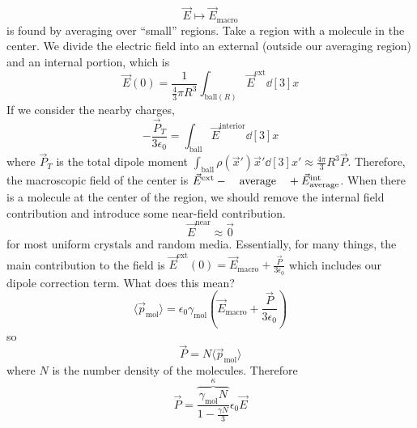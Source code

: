 \documentclass[a4paper,twoside,master.tex]{subfiles}
\begin{document}
\begin{equation}
    \vec{E} \mapsto \vec{E}_{\text{macro}}
\end{equation}
is found by averaging over ``small'' regions. Take a region with a molecule in the center. We divide the electric field into an external (outside our averaging region) and an internal portion, which is
\begin{equation}
    \vec{E}(0) = \frac{1}{\frac{4}{3} \pi R^3} \int_{\text{ball}(R)} \vec{E}^{\text{ext}} \dd[3]{x}
\end{equation}
If we consider the nearby charges,
\begin{equation}
    - \frac{ \vec{P}_T}{3 \epsilon_0} = \int_{\text{ball}} \vec{E}^{\text{interior}} \dd[3]{x}
\end{equation}
where $ \vec{P}_T $ is the total dipole moment $\int_{\text{ball}}\rho(\vec{x}')\vec{x}'\dd[3]{x'}\approx\frac{4 \pi}{3} R^3 \vec{P} $.
Therefore, the macroscopic field of the center is $ \vec{E}^{\text{ext}} - \qq{average} + \vec{E}^{\text{int}}_{\text{average}} $. When there is a molecule at the center of the region, we should remove the internal field contribution and introduce some near-field contribution.
\begin{equation}
    \vec{E}^{\text{near}} \approx\vec{0}
\end{equation}
for most uniform crystals and random media. Essentially, for many things, the main contribution to the field is $ \vec{E}^{\text{ext}} (0) = \vec{E}_{\text{macro}} + \frac{ \vec{P}}{3 \epsilon_0} $ which includes our dipole correction term. What does this mean?
\begin{equation}
    \langle \vec{p}_{\text{mol}} \rangle = \epsilon_0 \gamma_{\text{mol}} \left( \vec{E}_{\text{macro}} + \frac{ \vec{P}}{3 \epsilon_0} \right)
\end{equation}
so
\begin{equation}
    \vec{P} = N\langle \vec{p}_{\text{mol}} \rangle
\end{equation}
where $ N $ is the number density of the molecules. Therefore
\begin{equation}
    \vec{P} = \overbrace{\frac{\gamma_{\text{mol}} N}{1 - \frac{\gamma N}{3}}}^{\kappa} \epsilon_0 \vec{E}
\end{equation}
\end{document}
